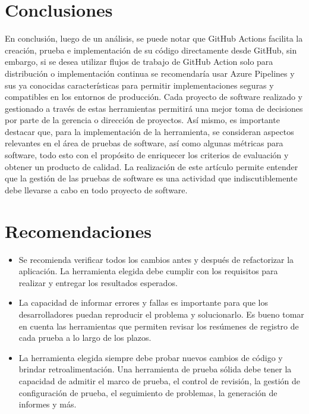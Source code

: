 \documentclass[twoside,twocolumn]{article}
\begin{document}

\newpage

\section{Conclusiones}

En conclusión, luego de un análisis, se puede notar que GitHub Actions facilita la creación, prueba e implementación de su código directamente desde GitHub, sin embargo, si se desea utilizar flujos de trabajo de GitHub Action solo para distribución o implementación continua se recomendaría usar Azure Pipelines y sus ya conocidas características para permitir implementaciones seguras y compatibles en los entornos de producción.
Cada proyecto de software realizado y gestionado a través de estas herramientas permitirá una mejor toma de decisiones por parte de la gerencia o dirección de proyectos.
Así mismo, es importante destacar que, para la implementación de la herramienta, se consideran aspectos relevantes en el área de pruebas de software, así como algunas métricas para software, todo esto con el propósito de enriquecer los criterios de evaluación y obtener un producto de calidad.
La realización de este artículo permite entender que la gestión de las pruebas de software es una actividad que indiscutiblemente debe llevarse a cabo en todo proyecto de software.


\section{Recomendaciones}


\begin{itemize}
\item Se recomienda verificar todos los cambios antes y después de refactorizar la aplicación. La herramienta elegida debe cumplir con los requisitos para realizar y entregar los resultados esperados.
\item La capacidad de informar errores y fallas es importante para que los desarrolladores puedan reproducir el problema y solucionarlo. Es bueno tomar en cuenta las herramientas que permiten revisar los resúmenes de registro de cada prueba a lo largo de los plazos.
\item La herramienta elegida siempre debe probar nuevos cambios de código y brindar retroalimentación. Una herramienta de prueba sólida debe tener la capacidad de admitir el marco de prueba, el control de revisión, la gestión de configuración de prueba, el seguimiento de problemas, la generación de informes y más.


\end{itemize}
\end{document}

